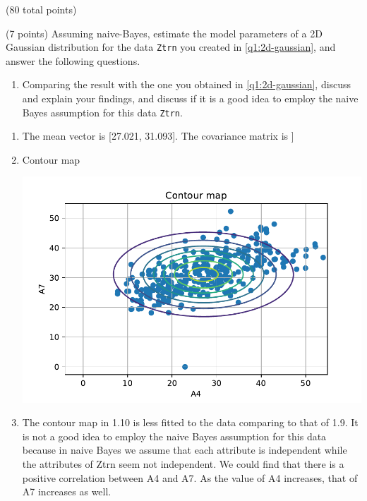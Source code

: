 \documentclass[12pt]{article}
\begin{document}
\begin{question}{(80 total points) \qOneTitle}
\begin{subquestion}{(7 points)
    Assuming naive-Bayes, estimate the model parameters of a 2D Gaussian distribution for the data {\tt Ztrn} you created in \ref{q1:2d-gaussian}, and answer the following questions.
  }
\begin{enumerate}
  \item Comparing the result with the one you obtained in \ref{q1:2d-gaussian}, discuss and explain your findings, and discuss if it is a good idea to employ the naive Bayes assumption for this data {\tt Ztrn}.
  \end{enumerate}
   

  \begin{answerbox}{0.75\textheight}
    \begin{enumerate}
    \item The mean vector is [27.021, 31.093]. 
    \newline The covariance matrix is 
    \newline [[84.918, -4.186] \newline [-4.186, 41.217]]
    \item Contour map
        \begin{center}
         \includegraphics[scale=1.0]{Contour2.pdf}
        \end{center}
    \item The contour map in 1.10 is less fitted to the data comparing to that of 1.9. It is not a good idea to employ the naive Bayes assumption for this data because in naive Bayes we assume that each attribute is independent while the attributes of Ztrn seem not independent. We could find that there is a  positive correlation between A4 and A7. As the value of A4 increases, that of A7 increases as well.
    \end{enumerate}
  \end{answerbox}
  


\end{subquestion}



\end{question}
\end{document}
